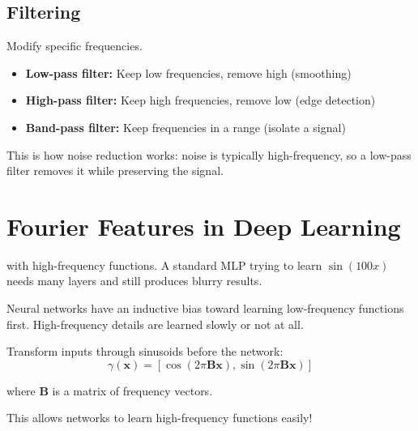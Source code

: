 \subsection{Filtering}

 Modify specific frequencies.

\begin{itemize}
    \item \textbf{Low-pass filter:} Keep low frequencies, remove high (smoothing)
    \item \textbf{High-pass filter:} Keep high frequencies, remove low (edge detection)
    \item \textbf{Band-pass filter:} Keep frequencies in a range (isolate a signal)
\end{itemize}

This is how noise reduction works: noise is typically high-frequency, so a low-pass filter removes it while preserving the signal.




\newpage
\section{Fourier Features in Deep Learning}

 with high-frequency functions. A standard MLP trying to learn $\sin(100x)$ needs many layers and still produces blurry results.

 Neural networks have an inductive bias toward learning low-frequency functions first. High-frequency details are learned slowly or not at all.


 Transform inputs through sinusoids before the network:
\begin{equation}
    \gamma(\mathbf{x}) = [\cos(2\pi \mathbf{B} \mathbf{x}), \sin(2\pi \mathbf{B} \mathbf{x})]
\end{equation}

where $\mathbf{B}$ is a matrix of frequency vectors.

This allows networks to learn high-frequency functions easily!


